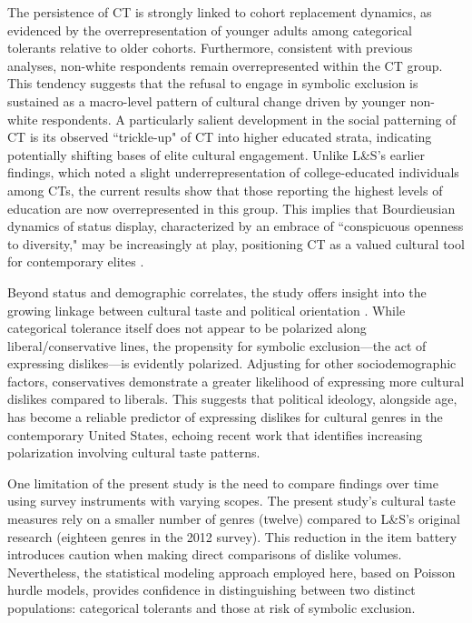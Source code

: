 \documentclass[12pt]{article}
\begin{document}
The persistence of CT is strongly linked to cohort replacement dynamics, as evidenced by the overrepresentation of younger adults among categorical tolerants relative to older cohorts. Furthermore, consistent with previous analyses, non-white respondents remain overrepresented within the CT group. This tendency suggests that the refusal to engage in symbolic exclusion is sustained as a macro-level pattern of cultural change driven by younger non-white respondents. A particularly salient development in the social patterning of CT is its observed ``trickle-up" of CT into higher educated strata, indicating potentially shifting bases of elite cultural engagement. Unlike L\&S's earlier findings, which noted a slight underrepresentation of college-educated individuals among CTs, the current results show that those reporting the highest levels of education are now overrepresented in this group. This implies that Bourdieusian dynamics of status display, characterized by an embrace of ``conspicuous openness to diversity," may be increasingly at play, positioning CT as a valued cultural tool for contemporary elites \citep{jarness2017im-001, ollivier2008modes-96f}.

Beyond status and demographic correlates, the study offers insight into the growing linkage between cultural taste and political orientation \citep{rawlings2023polarization-0af}. While categorical tolerance itself does not appear to be polarized along liberal/conservative lines, the propensity for symbolic exclusion---the act of expressing dislikes---is evidently polarized. Adjusting for other sociodemographic factors, conservatives demonstrate a greater likelihood of expressing more cultural dislikes compared to liberals. This suggests that political ideology, alongside age, has become a reliable predictor of expressing dislikes for cultural genres in the contemporary United States, echoing recent work that identifies increasing polarization involving cultural taste patterns.

One limitation of the present study is the need to compare findings over time using survey instruments with varying scopes. The present study's cultural taste measures rely on a smaller number of genres (twelve) compared to L\&S's original research (eighteen genres in the 2012 survey). This reduction in the item battery introduces caution when making direct comparisons of dislike volumes. Nevertheless, the statistical modeling approach employed here, based on Poisson hurdle models, provides confidence in distinguishing between two distinct populations: categorical tolerants and those at risk of symbolic exclusion.
\end{document}
